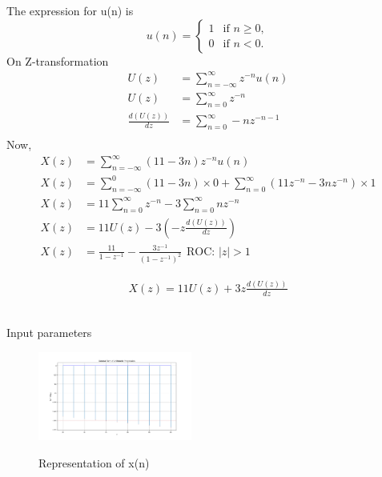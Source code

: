 \documentclass[journal,12pt,twocolumn]{IEEEtran}
\theoremstyle{remark}
\begin{document}
The expression for u(n) is 
\[ u(n) = \begin{cases}
    1 & \text{if } n \geq 0, \\
    0 & \text{if } n < 0.
\end{cases} \]
On Z-transformation
\[\begin{aligned}
U(z)&=\sum\limits_{n=-\infty}^{\infty}z^{-n}u(n)\\
U(z)&=\sum\limits_{n=0}^{\infty}z^{-n}\\
\frac{d(U(z))}{dz}&=\sum\limits_{n=0}^{\infty}-nz^{-n-1}\\
\end{aligned}\]
Now,
\[\begin{aligned}
   X(z)&=\sum\limits_{n=-\infty}^{\infty}(11-3n)z^{-n}u(n)\\
   X(z)&=\sum\limits_{n=-\infty}^{0}(11-3n)\times0 +\sum\limits_{n=0}^{\infty}(11z^{-n}-3nz^{-n})\times1\\
   X(z)&=11\sum\limits_{n=0}^{\infty}z^{-n}-3\sum\limits_{n=0}^{\infty}nz^{-n}\\
   X(z)&=11U(z)-3\left(-z\frac{d(U(z))}{dz}\right)\\
   X(z)&=\frac{11}{1-z^{-1}}-\frac{3z^{-1}}{(1-z^{-1})^2}\hspace{5pt}
   \text{ROC: $|z|>1$}
\end{aligned}\]

\begin{align}
 \boxed{X(z)=11U(z)+3z\frac{d(U(z))}{dz}}  
\end{align}
    \begin{table}[h]
    \centering
    
        \\
        
    \caption{Input parameters}
    \label{Table 1}
\end{table}

\begin{figure}[ht]
  \centering
  \includegraphics[width=0.45\textwidth]{figs/Figure_1.png}\\
  \captionsetup {justification=centering}
  \caption{Representation of x(n)}
  \label{Figure_1}
\end{figure}
\end{document}
